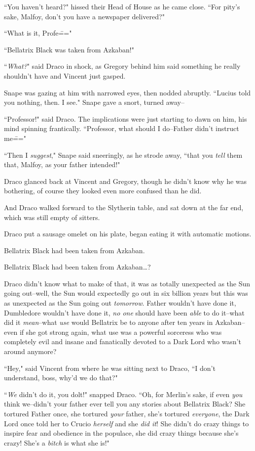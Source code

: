 ``You haven't heard?" hissed their Head of House as he came close. ``For pity's sake, Malfoy, don't you have a newspaper delivered?"

``What is it, Profe\==="

``Bellatrix Black was taken from Azkaban!"

``\emph{What?}" said Draco in shock, as Gregory behind him said something he really shouldn't have and Vincent just gasped.

Snape was gazing at him with narrowed eyes, then nodded abruptly. ``Lucius told you nothing, then. I see." Snape gave a snort, turned away\---

``Professor!" said Draco. The implications were just starting to dawn on him, his mind spinning frantically. ``Professor, what should I do\---Father didn't instruct me\==="

``Then I \emph{suggest}," Snape said sneeringly, as he strode away, ``that you \emph{tell} them that, Malfoy, as your father intended!"

Draco glanced back at Vincent and Gregory, though he didn't know why he was bothering, of course they looked even more confused than he did.

And Draco walked forward to the Slytherin table, and sat down at the far end, which was still empty of sitters.

Draco put a sausage omelet on his plate, began eating it with automatic motions.

Bellatrix Black had been taken from Azkaban.

Bellatrix Black had been taken from Azkaban{\ldots}?

Draco didn't know what to make of that, it was as totally unexpected as the Sun going out\---well, the Sun would expectedly go out in six billion years but this was as unexpected as the Sun going out \emph{tomorrow}. Father wouldn't have done it, Dumbledore wouldn't have done it, \emph{no one} should have been \emph{able} to do it\---what did it \emph{mean}\---what \emph{use} would Bellatrix be to anyone after ten years in Azkaban\---even if she got strong again, what use was a powerful sorceress who was completely evil and insane and fanatically devoted to a Dark Lord who wasn't around anymore?

``Hey," said Vincent from where he was sitting next to Draco, ``I don't understand, boss, why'd we do that?"

``\emph{We} didn't do it, you dolt!" snapped Draco. ``Oh, for Merlin's sake, if even \emph{you} think we\---didn't your father ever tell you any stories about Bellatrix Black? She tortured Father once, she tortured \emph{your} father, she's tortured \emph{everyone}, the Dark Lord once told her to Crucio \emph{herself} and she \emph{did it}! She didn't do crazy things to inspire fear and obedience in the populace, she did crazy things because she's crazy! She's a \emph{bitch} is what she is!"

